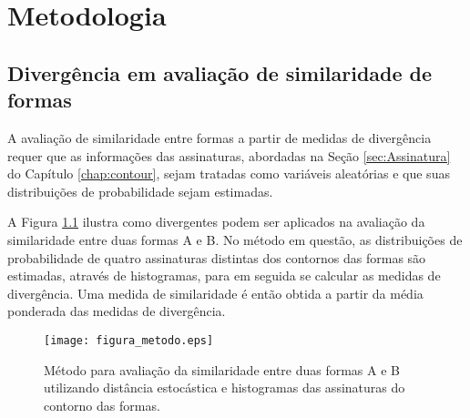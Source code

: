 \chapter{Metodologia}
\label{chap:MatMet}

\section{Divergência em avaliação de similaridade de formas}


A avaliação de similaridade entre formas a partir de medidas de divergência requer que as informações das assinaturas, abordadas na Seção \ref{sec:Assinatura} do Capítulo \ref{chap:contour}, sejam tratadas como variáveis aleatórias e que suas distribuições de probabilidade sejam estimadas. 

A  Figura \ref{fig:metodo_distancia} ilustra como divergentes podem ser aplicados na avaliação da similaridade entre duas formas A e B. No método em questão, as distribuições de probabilidade de quatro assinaturas distintas dos contornos das formas são estimadas, através de histogramas, para em seguida se calcular as medidas de divergência. Uma medida de similaridade é então obtida  a partir da média ponderada das medidas de divergência.

\begin{figure}[h!]
  \caption{\label{fig:metodo_distancia} Método para avaliação da similaridade entre duas formas A e B utilizando distância estocástica e histogramas das assinaturas do contorno das formas.}
  \centering
  \texttt{[image: figura\_metodo.eps]}
\end{figure}


